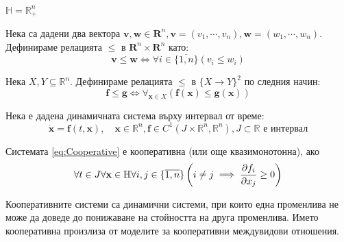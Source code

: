 \begin{definition}
  $\mathbb{H} = \mathbb{R}_{+}^n$
\end{definition}

\begin{definition}
  Нека са дадени два вектора $\mathbf{v}, \mathbf{w} \in \mathbf{R}^n, \mathbf{v}=(v_1, \cdots, v_n), \mathbf{w}=(w_1, \cdots, w_n)$. Дефинираме релацията $\leq$ в $\mathbf{R}^n \times \mathbf{R}^n$ като:
  \begin{equation*}
    \mathbf{v} \leq \mathbf{w} \iff \forall{i \in \{\overline{1,n}\}}(v_i \leq w_i)
  \end{equation*}
\end{definition}

\begin{definition}
  \label{def:FunctionLEQ}
  Нека $X, Y \subseteq \mathbb{R}^n$. Дефинираме релацията $\leq$ в $\{X \rightarrow Y\}^2$ по следния начин:
  \begin{equation*}
    \mathbf{f} \leq \mathbf{g} \iff \forall_{\mathbf{x} \in X} (\mathbf{f}(\mathbf{x}) \leq \mathbf{g}(\mathbf{x}))
  \end{equation*}
\end{definition}

Нека е дадена динамичната система върху интервал от време:
\begin{equation}
  \label{eq:Cooperative}
  \dot{\mathbf{x}} = \mathbf{f}(t, \mathbf{x}),  \quad \mathbf{x} \in \mathbb{R}^n, \mathbf{f} \in C^1(J \times \mathbb{R}^n, \mathbb{R}^n), J \subset \mathbb{R} \text{ е интервал}
\end{equation}

\begin{definition}
  \label{def:Cooperative}
  Системата \eqref{eq:Cooperative} е кооперативна (или още квазимонотонна), ако
  \begin{equation}
    \forall{t \in J}\forall{\mathbf{x} \in \mathbb{H}}\forall{i,j \in \{\overline{1,n}\}}\left(i \neq j \implies \pdv{f_i}{x_j}(t, \mathbf{x}) \geq 0\right)
  \end{equation}
\end{definition}
Кооперативните системи са динамични системи, при които една променлива не може да доведе до понижаване на стойността на друга променлива. Името кооперативна произлиза от моделите за кооперативни междувидови отношения.


